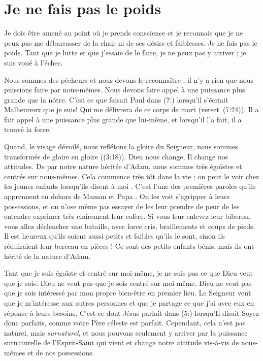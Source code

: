 \section{Je ne fais pas le poids}

Je dois être amené au point où je prends conscience et
 je reconnais que je ne peux pas me débarrasser de la chair
 ni de ses désirs et faiblesses.
 Je ne fais pas le poids. Tant que je lutte et que j'essaie de le faire,
 je ne peux pas y arriver ; je suis voué à l'échec.

Nous sommes des pécheurs et nous devons le reconnaître ;
 il n'y a rien que nous puissions faire par nous-mêmes.
 Nous devons faire appel à une puissance plus grande que la nôtre.
 C'est ce que faisait Paul dans (7:) lorsqu'il s'écriait\frcolon{}
 \Og Malheureux que je suis! Qui me délivrera de ce corps de mort \Fg{}
 (verset~(7:24)).
 Il a fait appel à une puissance plus grande que lui-même,
 et lorsqu'il l'a fait, il a trouvé la force.

\Og Quand, le visage dévoilé, nous reflétons la gloire du Seigneur,
nous sommes transformés de gloire en gloire \Fg{} ((3:18)).
 Dieu nous change, Il change nos attitudes.
 De par notre nature héritée d'Adam, nous sommes très égoïstes
 et centrés sur nous-mêmes.
 Cela commence très tôt dans la vie ; on peut le voir chez les jeunes enfants
 lorsqu'ils disent \Og à moi \Fg{}.
 C'est l'une des premières paroles qu'ils apprennent
 en dehors de \Og Maman \Fg{} et \Og Papa \Fg{}.
 On les voit s'agripper à leurs possessions, et on n'ose même pas
 essayer de les leur prendre de peur de les entendre exprimer très clairement leur colère.
 Si vous leur enlevez leur biberon, vous allez déclencher une bataille,
 avec force cris, braillements et coups de pieds.
 Il est heureux qu'ils soient aussi petits et faibles qu'ils le sont,
 sinon ils réduiraient leur berceau en pièces !
 Ce sont des petits enfants bénis,
 mais ils ont hérité de la nature d'Adam.

Tant que je suis égoïste et centré sur moi-même,
 je ne suis pas ce que Dieu veut que je sois.
 Dieu ne veut pas que je sois centré sur moi-même.
 Dieu ne veut pas que je sois intéressé par mon propre bien-être
 en premier lieu.
 Le Seigneur veut que je m'intéresse aux autres personnes et que
 je partage ce que j'ai avec eux en réponse à leurs besoins.
 C'est ce dont Jésus parlait dans (5:) lorsqu'Il disait\frcolon{}
 \Og Soyez donc parfaits, comme votre Père céleste est parfait. \Fg{}
 Cependant, cela n'est pas naturel, mais \emph{surnaturel},
 et nous pouvons seulement
 y arriver par la puissance surnaturelle de l'Esprit-Saint
 qui vient et change notre attitude vis-à-vis de nous-mêmes
 et de nos possessions.

